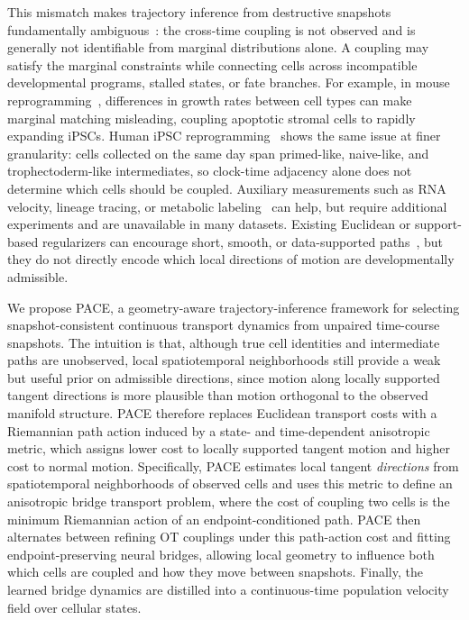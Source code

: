 This mismatch makes trajectory inference from destructive snapshots fundamentally ambiguous~\citep{weinreb2018fundamental,tritschler2019concepts}: the cross-time coupling is not observed and is generally not identifiable from marginal distributions alone. A coupling may satisfy the marginal constraints while connecting cells across incompatible developmental programs, stalled states, or fate branches. For example, in mouse reprogramming~\citep{schiebinger2019optimal}, differences in growth rates between cell types can make marginal matching misleading, coupling apoptotic stromal cells to rapidly expanding iPSCs. %
Human iPSC reprogramming~\citep{liu2020reprogramming} shows the same issue at finer granularity: cells collected on the same day span primed-like, naive-like, and trophectoderm-like intermediates, so clock-time adjacency alone does not determine which cells should be coupled.
Auxiliary measurements such as RNA velocity, lineage tracing, or metabolic labeling~\citep{la2018rna,bergen2020generalizing,lange2022cellrank} can help, but require additional experiments and are unavailable in many datasets. Existing Euclidean or support-based regularizers can encourage short, smooth, or data-supported paths~\citep{saelens2019comparison}, but they do not directly encode which local directions of motion are developmentally admissible.

We propose PACE, a geometry-aware trajectory-inference framework for selecting snapshot-consistent continuous transport dynamics from unpaired time-course snapshots.
The intuition is that, although true cell identities and intermediate paths are unobserved, local spatiotemporal neighborhoods still provide a weak but useful prior on admissible directions, since motion along locally supported tangent directions is more plausible than motion orthogonal to the observed manifold structure.
PACE therefore replaces Euclidean transport costs with a Riemannian path action induced by a state- and time-dependent anisotropic metric, which assigns lower cost to locally supported tangent motion and higher cost to normal motion.
Specifically, PACE estimates local tangent \emph{directions} from spatiotemporal neighborhoods of observed cells and uses this metric to define an anisotropic bridge transport problem, where the cost of coupling two cells is the minimum Riemannian action of an endpoint-conditioned path.
PACE then alternates between refining OT couplings under this path-action cost and fitting endpoint-preserving neural bridges, allowing local geometry to influence both which cells are coupled and how they move between snapshots.
Finally, the learned bridge dynamics are distilled into a continuous-time population velocity field over cellular states.

